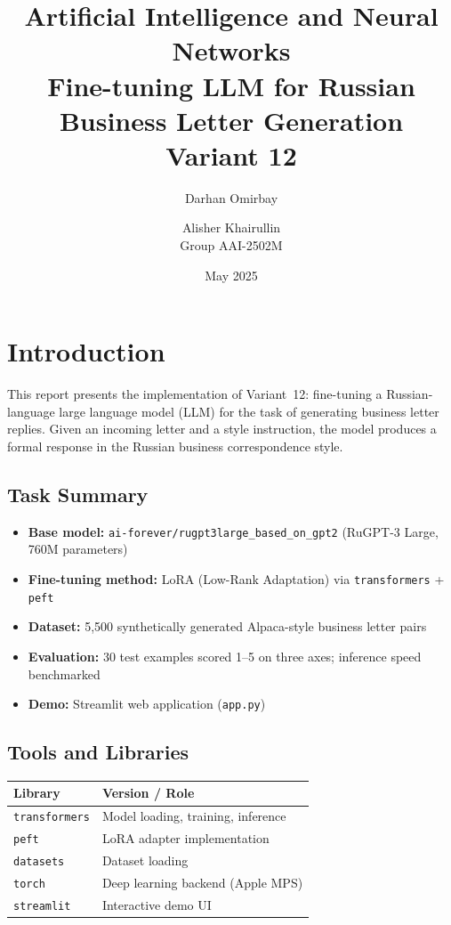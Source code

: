 \documentclass[12pt,a4paper]{article}
\title{
  \vspace{1cm}
  {\Large Artificial Intelligence and Neural Networks}\\[0.5em]
  {\LARGE \textbf{Fine-tuning LLM for Russian Business Letter Generation}}\\[0.5em]
  {\large Variant 12}
  \vspace{0.5cm}
}
\author{
  Darhan Omirbay \and Alisher Khairullin \\[0.5em]
  \normalsize Group AAI-2502M
}
\date{May 2025}
\begin{document}
\maketitle
\thispagestyle{empty}
\newpage

\tableofcontents
\newpage

\section{Introduction}

This report presents the implementation of Variant~12: fine-tuning a Russian-language large language model (LLM) for the task of generating business letter replies. Given an incoming letter and a style instruction, the model produces a formal response in the Russian business correspondence style.

\subsection{Task Summary}

\begin{itemize}
  \item \textbf{Base model:} \texttt{ai-forever/rugpt3large\_based\_on\_gpt2} (RuGPT-3 Large, 760M parameters)
  \item \textbf{Fine-tuning method:} LoRA (Low-Rank Adaptation) via \texttt{transformers} + \texttt{peft}
  \item \textbf{Dataset:} 5,500 synthetically generated Alpaca-style business letter pairs
  \item \textbf{Evaluation:} 30 test examples scored 1--5 on three axes; inference speed benchmarked
  \item \textbf{Demo:} Streamlit web application (\texttt{app.py})
\end{itemize}

\subsection{Tools and Libraries}

\begin{center}
\begin{tabular}{ll}
\toprule
Library & Version / Role \\
\midrule
\texttt{transformers} & Model loading, training, inference \\
\texttt{peft} & LoRA adapter implementation \\
\texttt{datasets} & Dataset loading \\
\texttt{torch} & Deep learning backend (Apple MPS) \\
\texttt{streamlit} & Interactive demo UI \\
\bottomrule
\end{tabular}
\end{center}
\end{document}
